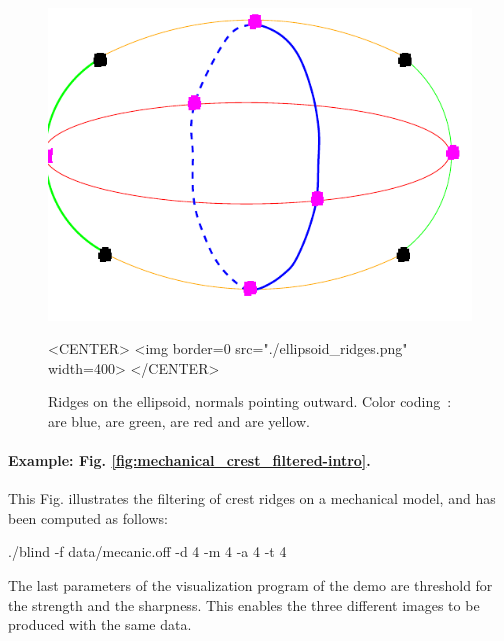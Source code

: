 \begin{figure}[!ht]
\begin{ccTexOnly}
\centerline{
\includegraphics[width=.5\linewidth]{Ridges_3/ellipsoid_ridges}}
\end{ccTexOnly}

\begin{ccHtmlOnly}
<CENTER> <img border=0 src="./ellipsoid_ridges.png" width=400>
</CENTER>
\end{ccHtmlOnly}
\caption{Ridges on the ellipsoid, normals pointing outward.
 Color coding~:  are blue,
 are green,  are red and 
 are yellow. }
\label{ellipsoid-ridges-example}
\end{figure}

\paragraph{Example:  Fig.  \ref{fig:mechanical_crest_filtered-intro}.}
This Fig. illustrates the filtering of crest ridges on a mechanical
model, and has been computed as follows:
\begin{ccExampleCode}
./blind -f data/mecanic.off -d 4 -m 4 -a 4 -t 4
\end{ccExampleCode}
The last parameters of the visualization program of the demo are
threshold for the strength and the sharpness. This enables the three
different images to be produced with the same data.

